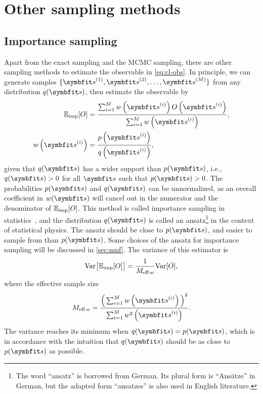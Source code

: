 \section{Other sampling methods}
\label{sec:more-sampling}

\subsection{Importance sampling}
\label{sec:importance-sampling}

Apart from the exact sampling and the MCMC sampling, there are other sampling methods to estimate the observable in \cref{eq:cl-obs}. In principle, we can generate samples $\{\vs^{(1)}, \vs^{(2)}, \ldots, \vs^{(M)}\}$ from any distribution $q(\vs)$, then estimate the observable by
\begin{align}
\bbE_\text{imp}[O] &= \frac{\sum_{i = 1}^M w\left( \vs^{(i)} \right) O\left( \vs^{(i)} \right)}{\sum_{i = 1}^M w\left( \vs^{(i)} \right)}, \label{eq:importance-sampling} \\
w\left( \vs^{(i)} \right) &= \frac{p\left( \vs^{(i)} \right)}{q\left(\vs^{(i)} \right)},
\end{align}
given that $q(\vs)$ has a wider support than $p(\vs)$, i.e., $q(\vs) > 0$ for all $\vs$ such that $p(\vs) > 0$. The probabilities $p(\vs)$ and $q(\vs)$ can be unnormalized, as an overall coefficient in $w(\vs)$ will cancel out in the numerator and the denominator of $\mathbb{E}_\text{imp}[O]$. This method is called importance sampling in statistics~\cite{kloek1978bayesian, bugallo2017adaptive}, and the distribution $q(\vs)$ is called an ansatz\footnote{The word ``ansatz'' is borrowed from German. Its plural form is ``Ansätze'' in German, but the adapted form ``ansatzes'' is also used in English literature.} in the context of statistical physics. The ansatz should be close to $p(\vs)$, and easier to sample from than $p(\vs)$. Some choices of the ansatz for importance sampling will be discussed in \cref{sec:nmf}. The variance of this estimator is
\begin{equation}
\mathrm{Var}\big[ \mathbb{E}_\text{imp}[O] \big] = \frac{1}{M_{\text{eff}\,w}} \mathrm{Var}[\bar{O}],
\label{eq:importance-sampling-var}
\end{equation}
where the effective sample size
\begin{equation}
M_{\text{eff}\,w} = \frac{\Big( \sum_{i = 1}^M w\left( \vs^{(i)} \right) \Big)^2}{\sum_{i = 1}^M w^2\left( \vs^{(i)} \right)}.
\label{eq:eff-sample-size-w}
\end{equation}
The variance reaches its minimum when $q(\vs) = p(\vs)$, which is in accordance with the intuition that $q(\vs)$ should be as close to $p(\vs)$ as possible.

